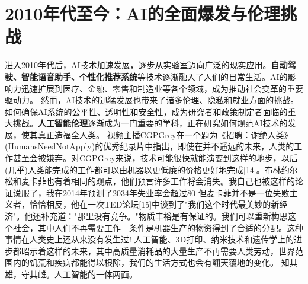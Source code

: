 \section{2010年代至今：AI的全面爆发与伦理挑战}
进入2010年代后，AI技术加速发展，逐步从实验室迈向广泛的现实应用。{\bf 自动驾驶、智能语音助手、个性化推荐系统}等技术逐渐融入了人们的日常生活。AI的影响力迅速扩展到医疗、金融、零售和制造业等各个领域，成为推动社会变革的重要驱动力。
然而，AI技术的迅猛发展也带来了诸多伦理、隐私和就业方面的挑战。如何确保AI系统的公平性、透明性和安全性，成为研究者和政策制定者面临的重大挑战。{\bf 人工智能伦理}逐渐成为一门重要的学科，正在研究如何规范AI技术的发展，使其真正造福全人类。
视频主播CGPGrey在一个题为《招聘：谢绝人类》(HumansNeedNotApply)的优秀纪录片中指出，即使在并不遥远的未来，人类的工作甚至会被嫌弃。对CGPGrey来说，技术可能很快就能演变到这样的地步，以后(几乎)人类能完成的工作都可以由机器以更低廉的价格更好地完成[14]。布林约尔松和麦卡菲也有着相同的观点，他们预言许多工作将会消失。我自己也被这样的论证说服了，我在2014年预测了2034年失业率会超过80%
但麦卡菲并不是一位失败主义者，恰恰相反，他在一次TED论坛[15]中谈到了"我们这个时代最美妙的新经济"。他还补充道："那里没有竞争。"物质丰裕是有保证的。我们可以重新构思这个社会，其中人们不再需要工作---条件是机器生产的物资得到了合适的分配。这种事情在人类史上还从来没有发生过!
%
人工智能、3D打印、纳米技术和遗传学上的进步都昭示着这样的未来，其中高质量消耗品的大量生产不再需要人类劳动，世界范围内的饥荒和疾病都能得以根除，我们的生活方式也会有翻天覆地的变化。
知其雄，守其雌。人工智能的一体两面。
